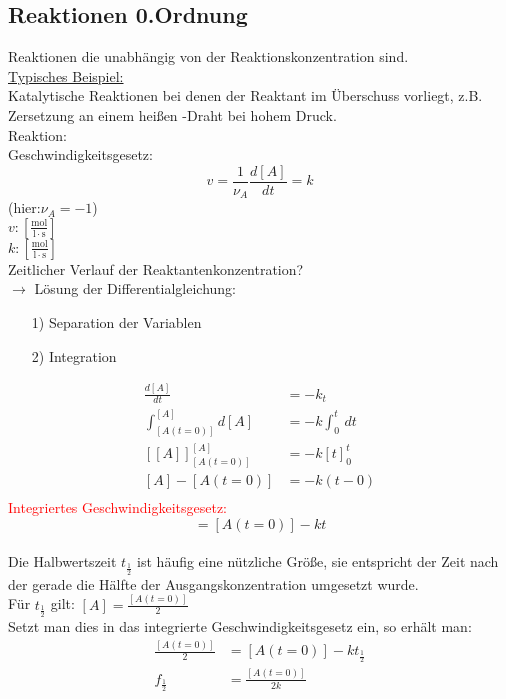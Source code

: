 \documentclass[a4paper, fleqn]{article}
\begin{document}
\subsection{Reaktionen 0.Ordnung}
Reaktionen die unabhängig von der Reaktionskonzentration sind.\\
\underline{Typisches Beispiel:}\\
Katalytische Reaktionen bei denen der Reaktant im Überschuss vorliegt, z.B. Zersetzung  an einem heißen -Draht bei hohem Druck.\\
Reaktion: \\
Geschwindigkeitsgesetz:
\begin{equation*}
    v = \frac{1}{\nu_A} \frac{d[A]}{dt} = k
\end{equation*}
(hier:$\nu_A = -1$)\\
$v: \left[\mathrm{\frac{mol}{l\cdot s}}\right]$\\
$k: \left[\mathrm{\frac{mol}{l\cdot s}}\right]$\\
Zeitlicher Verlauf der Reaktantenkonzentration?\\
$\rightarrow$ Lösung der Differentialgleichung:\\
\begin{itemize}
    \item[1)] Separation der Variablen
    \item[2)] Integration
\end{itemize}
\begin{align*}
    \frac{d[A]}{dt} &= -k_t\\
    \int_{[A(t=0)]}^{[A]} d[A] &= -k \int_{0}^{t}\,dt\\
    \left[[A]\right]_{[A(t=0)]}^{[A]} &= -k[t]_0^t\\
    [A]-[A(t=0)] &= -k(t-0)\\
\end{align*}
\textcolor{red}{Integriertes Geschwindigkeitsgesetz:}\\
\begin{equation*}
    [A] = [A(t=0)]-kt
\end{equation*}\\
Die Halbwertszeit $t_\frac{1}{2}$ ist häufig eine nützliche Größe, sie entspricht der Zeit nach der gerade die Hälfte der Ausgangskonzentration umgesetzt wurde.\\
Für $t_\frac{1}{2}$ gilt: $[A]=\frac{[A(t=0)]}{2}$\\
Setzt man dies in das integrierte Geschwindigkeitsgesetz ein, so erhält man:\\
\begin{align*}
    \frac{[A(t=0)]}{2} &= [A(t=0)]-kt_\frac{1}{2}\\
    f_\frac{1}{2} &= \frac{[A(t=0)]}{2k}
\end{align*}
\end{document}
